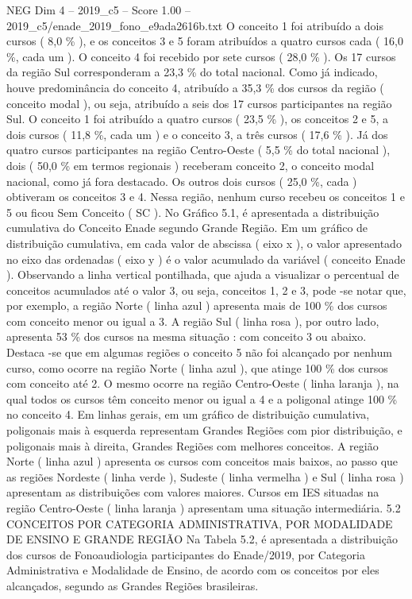 \begin{textsample}{NEG Dim 4 – 2019\_c5 – Score 1.00 – 2019\_c5/enade\_2019\_fono\_e9ada2616b.txt}
O conceito 1 foi atribuído a dois cursos ( 8,0 \% ), e os conceitos 3 e 5 foram atribuídos a quatro cursos cada ( 16,0 \%, cada um ).
O conceito 4 foi recebido por sete cursos ( 28,0 \% ).
Os 17 cursos da região Sul corresponderam a 23,3 \% do total nacional.
Como já indicado, houve predominância do conceito 4, atribuído a 35,3 \% dos cursos da região ( conceito modal ), ou seja, atribuído a seis dos 17 cursos participantes na região Sul.
O conceito 1 foi atribuído a quatro cursos ( 23,5 \% ), os conceitos 2 e 5, a dois cursos ( 11,8 \%, cada um ) e o conceito 3, a três cursos ( 17,6 \% ).
Já dos quatro cursos participantes na região Centro-Oeste ( 5,5 \% do total nacional ), dois ( 50,0 \% em termos regionais ) receberam conceito 2, o conceito modal nacional, como já fora destacado.
Os outros dois cursos ( 25,0 \%, cada ) obtiveram os conceitos 3 e 4.
Nessa região, nenhum curso recebeu os conceitos 1 e 5 ou ficou Sem Conceito ( SC ).
No Gráfico 5.1, é apresentada a distribuição cumulativa do Conceito Enade segundo Grande Região.
Em um gráfico de distribuição cumulativa, em cada valor de abscissa ( eixo x ), o valor apresentado no eixo das ordenadas ( eixo y ) é o valor acumulado da variável ( conceito Enade ).
Observando a linha vertical pontilhada, que ajuda a visualizar o percentual de conceitos acumulados até o valor 3, ou seja, conceitos 1, 2 e 3, pode -se notar que, por exemplo, a região Norte ( linha azul ) apresenta mais de 100 \% dos cursos com conceito menor ou igual a 3.
A região Sul ( linha rosa ), por outro lado, apresenta 53 \% dos cursos na mesma situação : com conceito 3 ou abaixo.
Destaca -se que em algumas regiões o conceito 5 não foi alcançado por nenhum curso, como ocorre na região Norte ( linha azul ), que atinge 100 \% dos cursos com conceito até 2.
O mesmo ocorre na região Centro-Oeste ( linha laranja ), na qual todos os cursos têm conceito menor ou igual a 4 e a poligonal atinge 100 \% no conceito 4.
Em linhas gerais, em um gráfico de distribuição cumulativa, poligonais mais à esquerda representam Grandes Regiões com pior distribuição, e poligonais mais à direita, Grandes Regiões com melhores conceitos.
A região Norte ( linha azul ) apresenta os cursos com conceitos mais baixos, ao passo que as regiões Nordeste ( linha verde ), Sudeste ( linha vermelha ) e Sul ( linha rosa ) apresentam as distribuições com valores maiores.
Cursos em IES situadas na região Centro-Oeste ( linha laranja ) apresentam uma situação intermediária. 5.2 CONCEITOS POR CATEGORIA ADMINISTRATIVA, POR MODALIDADE DE ENSINO E GRANDE REGIÃO Na Tabela 5.2, é apresentada a distribuição dos cursos de Fonoaudiologia participantes do Enade/2019, por Categoria Administrativa e Modalidade de Ensino, de acordo com os conceitos por eles alcançados, segundo as Grandes Regiões brasileiras.

\end{textsample}
